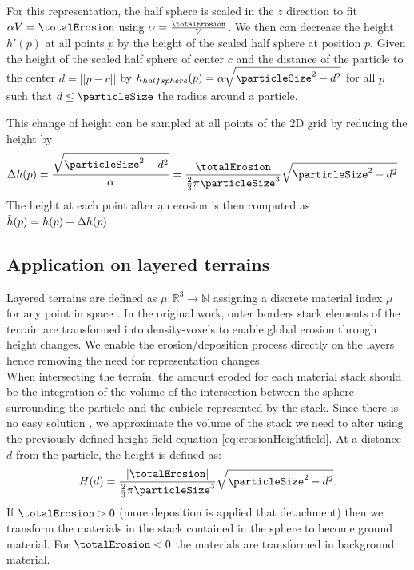 For this representation, the half sphere is scaled in the $z$ direction to fit $\alpha V = \totalErosion$ using $\alpha = \frac{\totalErosion}{V}$. We then can decrease the height $h'(p)$ at all points $p$ by the height of the scaled half sphere at position $p$. Given the height of the scaled half sphere of center $c$ and the distance of the particle to the center $d = ||p - c||$ by $h_{half sphere}(p) = \alpha \sqrt{\particleSize^2 - d^2}$ for all $p$ such that $d \leq \particleSize$ the radius around a particle.

This change of height can be sampled at all points of the 2D grid by reducing the height by 
\begin{align} 
\label{eq:erosionHeightfield}
\Delta h(p) &= \frac{\sqrt{\particleSize^2 - d^2}}{\alpha} = \frac{\totalErosion}{\frac{2}{3} \pi \particleSize^3} \sqrt{\particleSize^2 - d^2}
\end{align}
The height at each point after an erosion is then computed as $\Tilde{h}(p) = h(p) + \Delta h(p)$.

\subsection{Application on layered terrains}
\label{sec:application_on_layers}
Layered terrains are defined as $\mu: \mathbb{R}^3 \rightarrow \mathbb{N}$ assigning a discrete material index $\mu$ for any point in space \cite{Benes2001, Peytavie2009}. In the original work, outer borders stack elements of the terrain are transformed into density-voxels to enable global erosion through height changes. We enable the erosion/deposition process directly on the layers hence removing the need for representation changes. \\ 
When intersecting the terrain, the amount eroded for each material stack should be the integration of the volume of the intersection between the sphere surrounding the particle and the cubicle represented by the stack. Since there is no easy solution \cite{Jones2017}, we approximate the volume of the stack we need to alter using the previously defined height field equation \eqref{eq:erosionHeightfield}. 
At a distance $d$ from the particle, the height is defined as:
\begin{align} \label{eq:erosionLayers}
H(d) = \frac{|\totalErosion|}{\frac{2}{3} \pi \particleSize^3} \sqrt{\particleSize^2 - d^2}.
\end{align}
If $\totalErosion > 0$ (more deposition is applied that detachment) then we transform the materials in the stack contained in the sphere to become ground material. For $\totalErosion < 0$ the materials are transformed in background material.

